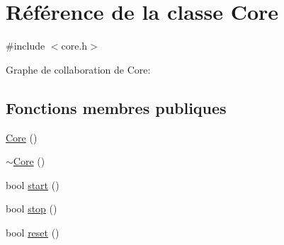 \hypertarget{class_core}{\section{Référence de la classe Core}
\label{class_core}
}


{\ttfamily \#include $<$core.\-h$>$}



Graphe de collaboration de Core\-:
\subsection*{Fonctions membres publiques}
\begin{DoxyCompactItemize}
\item 
\hyperlink{class_core_a14e63188e0aa7c4a6f72d5501384d1f9}{Core} ()
\item 
\hyperlink{class_core_a776f8c46504b14183883c6273f93eaed}{$\sim$\-Core} ()
\item 
bool \hyperlink{class_core_a722434c9873d07d6b26a74e40e08eb9c}{start} ()
\item 
bool \hyperlink{class_core_a01ec355d4fc9be14623bb7b249ad9562}{stop} ()
\item 
bool \hyperlink{class_core_a85d7a4a5672973830aa10185b121ded9}{reset} ()
\end{DoxyCompactItemize}
